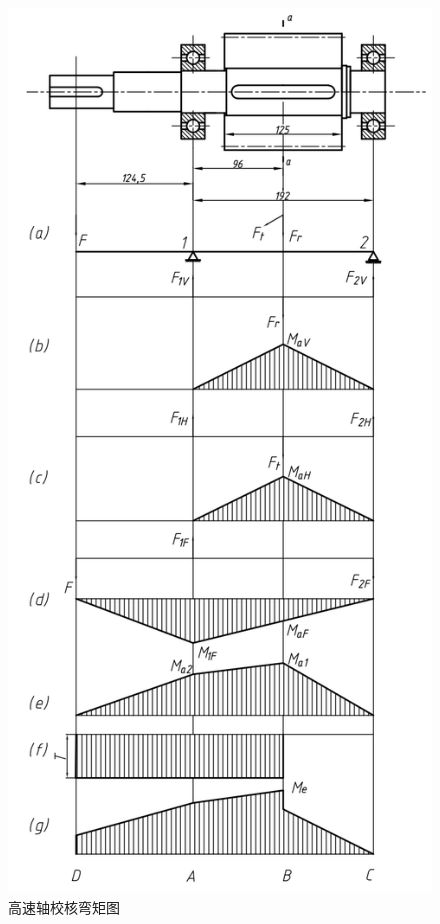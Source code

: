 \documentclass[12pt]{ctexart}
\begin{document}
\begin{figure}[htbp]
    \centering
    \includegraphics[scale = 0.4]{high_speed_roller.png}
    \caption{高速轴校核弯矩图}\label{figure10}
\end{figure}
\end{document}
